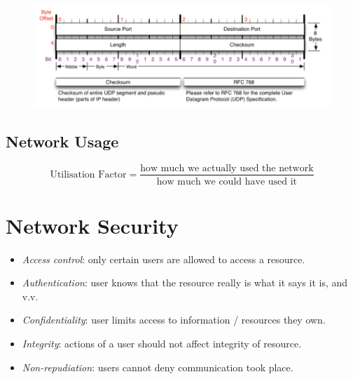 \documentclass[twocolumn,english]{article}
\begin{document}
\begin{figure}[H]
\centering{}\includegraphics[width=0.75\linewidth]{img/udp}
\end{figure}

\subsection{Network Usage}

\[
\text{Utilisation Factor}=\frac{\text{how much we actually used the network}}{\text{how much we could have used it}}
\]

\section{Network Security}
\begin{itemize}
\item \emph{Access control}: only certain users are allowed to access a
resource.
\item \emph{Authentication}: user knows that the resource really is what
it says it is, and v.v.
\item \emph{Confidentiality}: user limits access to information / resources
they own.
\item \emph{Integrity}: actions of a user should not affect integrity of
resource.
\item \emph{Non-repudiation}: users cannot deny communication took place.
\end{itemize}
\end{document}
